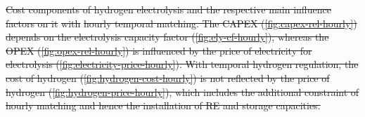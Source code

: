 \documentclass[5p,numafflabel]{elsarticle}
\providecommand{\DIFdeltex}[1]{{\protect\color{red}\sout{#1}}}                      %
\providecommand{\DIFdelFL}[1]{\DIFdel{#1}} %
\providecommand{\DIFdel}[1]{\texorpdfstring{\DIFdeltex{#1}}{}} %
\begin{document}
{%
\DIFdelFL{Cost components of hydrogen electrolysis and the respective main influence factors on it }%
\DIFdelFL{with}%
\DIFdelFL{hourly temporal matching. The CAPEX (\ref{fig:capex-rel-hourly}) depends on the electrolysis capacity factor (\ref{fig:ely-cf-hourly}), whereas the OPEX (\ref{fig:opex-rel-hourly}) is influenced by the price of electricity for electrolysis (\ref{fig:electricity-price-hourly}). With temporal hydrogen regulation, the cost of hydrogen  (\ref{fig:hydrogen-cost-hourly}) is not reflected by the price of hydrogen (\ref{fig:hydrogen-price-hourly}), which includes the additional constraint of hourly matching and hence the installation of RE and storage capacities.}}
\end{document}
